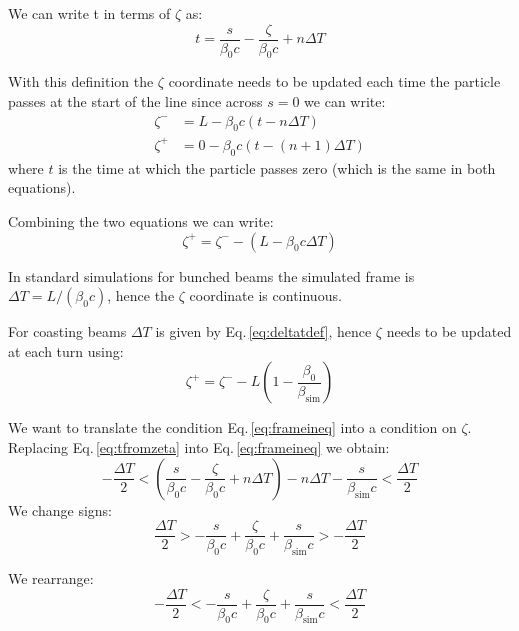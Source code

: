 We can write t in terms of $\zeta$ as:
\begin{equation}
 t = \frac{s}{\beta_0 c}  - \frac{\zeta}{\beta_0 c} + n\Delta T
 \label{eq:tfromzeta}
\end{equation}

With this definition the $\zeta$ coordinate needs to be updated each time the particle passes at the start of the line since across $s=0$ we can write:
\begin{align}
\zeta^- &= L - \beta_0 c (t - n\Delta T)\\
\zeta^+ &= 0 - \beta_0 c (t - (n+1)\Delta T)
\end{align}
where $t$ is the time at which the particle passes zero (which is the same in both equations).

Combining the two equations we can write:
\begin{equation}
\zeta^+ = \zeta^- - (L - \beta_0 c \Delta T)
\end{equation}

In standard simulations for bunched beams the simulated frame is $\Delta T = L / (\beta_0 c)$, hence the $\zeta$ coordinate is continuous.

For coasting beams $\Delta T$ is given by Eq.\,\ref{eq:deltatdef}, hence $\zeta$ needs to be updated at each turn using:
\begin{equation}
\boxed{
\zeta^+ = \zeta^- - L\left(1 - \frac{\beta_0}{\beta_\text{sim}} \right)
}
\end{equation}

We want to translate the condition Eq.\,\ref{eq:frameineq} into a condition on $\zeta$. Replacing Eq.\,\ref{eq:tfromzeta} into Eq.\,\ref{eq:frameineq} we obtain:
\begin{equation}
- \frac{\Delta T}{2} < \left(\frac{s}{\beta_0 c}  - \frac{\zeta}{\beta_0 c} + n \Delta T\right) - n \Delta T - \frac{s}{\beta_\text{sim} c} < \frac{\Delta T}{2}
\end{equation}
We change signs:
\begin{equation}
\frac{\Delta T}{2} > -\frac{s}{\beta_0 c}  + \frac{\zeta}{\beta_0 c} + \frac{s}{\beta_\text{sim} c} > -\frac{\Delta T}{2}
\end{equation}

We rearrange:
\begin{equation}
-\frac{\Delta T}{2} < -\frac{s}{\beta_0 c}  + \frac{\zeta}{\beta_0 c} + \frac{s}{\beta_\text{sim} c} < \frac{\Delta T}{2}
\end{equation}

